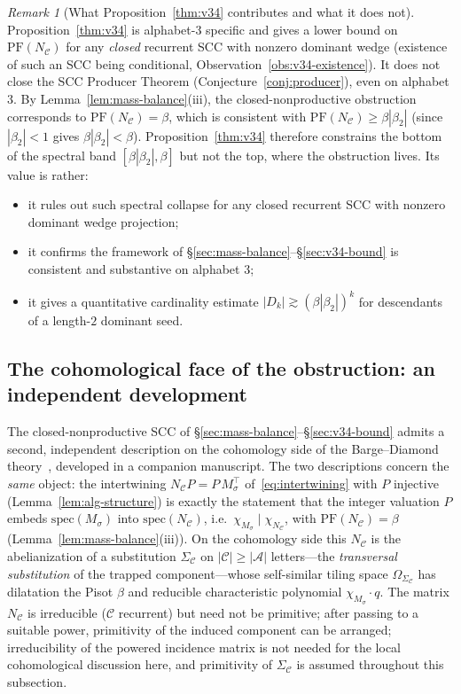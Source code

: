 \documentclass[11pt]{article}
\theoremstyle{plain}
\theoremstyle{definition}
\theoremstyle{remark}
\newtheorem{remark}[theorem]{Remark}
\newcommand{\A}{\mathcal{A}}
\newcommand{\C}{\mathcal{C}}
\newcommand{\PFroot}{\mathrm{PF}}
\newcommand{\spec}{\mathrm{spec}}
\begin{document}
\begin{remark}[What Proposition~\ref{thm:v34} contributes and what it does not]\label{rem:v34-scope}
Proposition~\ref{thm:v34} is alphabet-$3$ specific and gives a lower bound on $\PFroot(N_\C)$ for any \emph{closed} recurrent SCC with nonzero dominant wedge (existence of such an SCC being conditional, Observation~\ref{obs:v34-existence}). It does not close the SCC Producer Theorem (Conjecture~\ref{conj:producer}), even on alphabet 3. By Lemma~\ref{lem:mass-balance}(iii), the closed-nonproductive obstruction corresponds to $\PFroot(N_\C)=\beta$, which is consistent with $\PFroot(N_\C)\ge\beta|\beta_2|$ (since $|\beta_2|<1$ gives $\beta|\beta_2|<\beta$). Proposition~\ref{thm:v34} therefore constrains the bottom of the spectral band $[\beta|\beta_2|,\beta]$ but not the top, where the obstruction lives. Its value is rather:
\begin{itemize}[leftmargin=*]
\item it rules out such spectral collapse for any closed recurrent SCC with nonzero dominant wedge projection;
\item it confirms the framework of \S\ref{sec:mass-balance}--\S\ref{sec:v34-bound} is consistent and substantive on alphabet 3;
\item it gives a quantitative cardinality estimate $|D_k|\gtrsim(\beta|\beta_2|)^k$ for descendants of a length-$2$ dominant seed.
\end{itemize}
\end{remark}

\subsection{The cohomological face of the obstruction: an independent development}\label{sec:cohomology-companion}

The closed-nonproductive SCC of \S\ref{sec:mass-balance}--\S\ref{sec:v34-bound} admits a second, independent description on the cohomology side of the Barge--Diamond theory~\cite{BD08,Sa14}, developed in a companion manuscript. The two descriptions concern the \emph{same} object: the intertwining $N_\C P=P\,M_\sigma^\top$ of~\eqref{eq:intertwining} with $P$ injective (Lemma~\ref{lem:alg-structure}) is exactly the statement that the integer valuation $P$ embeds $\spec(M_\sigma)$ into $\spec(N_\C)$, i.e.\ $\chi_{M_\sigma}\mid\chi_{N_\C}$, with $\PFroot(N_\C)=\beta$ (Lemma~\ref{lem:mass-balance}(iii)). On the cohomology side this $N_\C$ is the abelianization of a substitution $\Sigma_\C$ on $|\C|\ge|\A|$ letters---the \emph{transversal substitution} of the trapped component---whose self-similar tiling space $\Omega_{\Sigma_\C}$ has dilatation the Pisot $\beta$ and reducible characteristic polynomial $\chi_{M_\sigma}\cdot q$. The matrix $N_\C$ is irreducible ($\C$ recurrent) but need not be primitive; after passing to a suitable power, primitivity of the induced component can be arranged; irreducibility of the powered incidence matrix is not needed for the local cohomological discussion here, and primitivity of $\Sigma_\C$ is assumed throughout this subsection.
\end{document}
